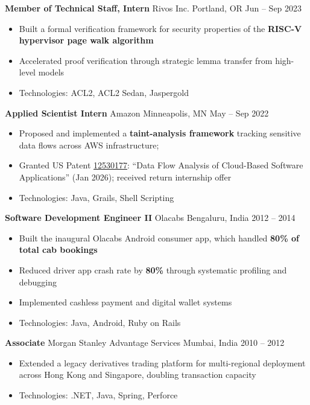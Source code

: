 \documentclass[11pt,letterpaper]{article}
\newcommand{\cvsubsection}[4]{ \textbf{#1} \textcolor{mediumgray}{\textbullet}
  #2 \textcolor{mediumgray}{\textbullet} #3 \textcolor{mediumgray}{\textbullet} #4 }
\begin{document}
\cvsubsection{Member of Technical Staff, Intern}{Rivos Inc.}{Portland,
  OR}{Jun -- Sep 2023}
\begin{itemize}
    \item Built a formal verification framework for security
      properties of the \textbf{RISC-V hypervisor page walk algorithm}
    \item Accelerated proof verification through strategic
      lemma transfer from high-level models
    \item Technologies: ACL2, ACL2 Sedan, Jaspergold
\end{itemize}

\cvsubsection{Applied Scientist Intern}{Amazon}{Minneapolis, MN}{May --
  Sep 2022}
\begin{itemize}
    \item Proposed and implemented a \textbf{taint-analysis framework} tracking sensitive data flows across AWS infrastructure;
    \item Granted US Patent
      \href{https://patents.google.com/patent/US12530177}{12530177}:
      ``Data Flow Analysis of Cloud-Based Software Applications'' (Jan
      2026); received return internship offer
    \item Technologies: Java, Grails, Shell Scripting
\end{itemize}

\cvsubsection{Software Development Engineer II}{Olacabs}{Bengaluru,
  India}{2012 -- 2014}
\begin{itemize}
    \item Built the inaugural Olacabs Android consumer app, which
      handled \textbf{80\% of total cab bookings}
    \item Reduced driver app crash rate by \textbf{80\%} through
      systematic profiling and debugging
    \item Implemented cashless payment and digital wallet systems
    \item Technologies: Java, Android, Ruby on Rails
\end{itemize}

\cvsubsection{Associate}{Morgan Stanley Advantage Services}{Mumbai,
  India}{2010 -- 2012}
\begin{itemize}
    \item Extended a legacy derivatives trading platform for
      multi-regional deployment across Hong Kong and Singapore,
      doubling transaction capacity
    \item Technologies: .NET, Java, Spring, Perforce
\end{itemize}
\end{document}
